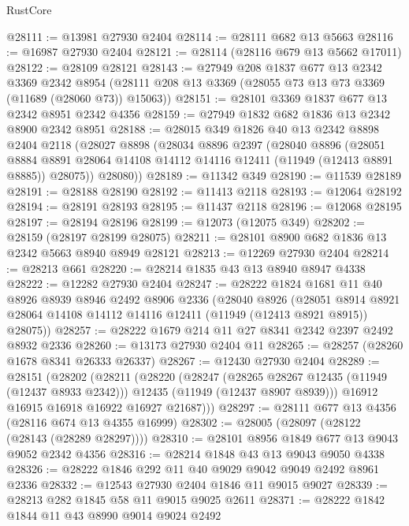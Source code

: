 \begin{lexlean}{RustCore}
\begin{coremodule}
@28111 := @13981 @27930 @2404
@28114 := @28111 @682 @13 @5663
@28116 := @16987 @27930 @2404
@28121 := @28114 (@28116 @679 @13 @5662 @17011)
@28122 := @28109 @28121
@28143 := @27949
    @208
    @1837
    @677
    @13
    @2342
    @3369
    @2342
    @8954
    (@28111 @208 @13 @3369 (@28055 @73 @13 @73 @3369 (@11689 (@28060 @73)) @15063))
@28151 := @28101 @3369 @1837 @677 @13 @2342 @8951 @2342 @4356
@28159 := @27949 @1832 @682 @1836 @13 @2342 @8900 @2342 @8951
@28188 := @28015
    @349
    @1826
    @40
    @13
    @2342
    @8898
    @2404
    @2118
    (@28027
      @8898
      (@28034
        @8896
        @2397
        (@28040
          @8896
          (@28051
            @8884
            @8891
            @28064
            @14108
            @14112
            @14116
            @12411
            (@11949 (@12413 @8891 @8885))
            @28075))
        @28080))
@28189 := @11342 @349
@28190 := @11539 @28189
@28191 := @28188 @28190
@28192 := @11413 @2118
@28193 := @12064 @28192
@28194 := @28191 @28193
@28195 := @11437 @2118
@28196 := @12068 @28195
@28197 := @28194 @28196
@28199 := @12073 (@12075 @349)
@28202 := @28159 (@28197 @28199 @28075)
@28211 := @28101 @8900 @682 @1836 @13 @2342 @5663 @8940 @8949 @28121
@28213 := @12269 @27930 @2404
@28214 := @28213 @661
@28220 := @28214 @1835 @43 @13 @8940 @8947 @4338
@28222 := @12282 @27930 @2404
@28247 := @28222
    @1824
    @1681
    @11
    @40
    @8926
    @8939
    @8946
    @2492
    @8906
    @2336
    (@28040
      @8926
      (@28051 @8914 @8921 @28064 @14108 @14112 @14116 @12411 (@11949 (@12413 @8921 @8915)) @28075))
@28257 := @28222 @1679 @214 @11 @27 @8341 @2342 @2397 @2492 @8932 @2336
@28260 := @13173 @27930 @2404 @11
@28265 := @28257 (@28260 @1678 @8341 @26333 @26337)
@28267 := @12430 @27930 @2404
@28289 := @28151
    (@28202
      (@28211
        (@28220
          (@28247
            (@28265 @28267 @12435 (@11949 (@12437 @8933 @2342)))
            @12435
            (@11949 (@12437 @8907 @8939)))
          @16912
          @16915
          @16918
          @16922
          @16927
          @21687)))
@28297 := @28111 @677 @13 @4356 (@28116 @674 @13 @4355 @16999)
@28302 := @28005 (@28097 (@28122 (@28143 (@28289 @28297))))
@28310 := @28101 @8956 @1849 @677 @13 @9043 @9052 @2342 @4356
@28316 := @28214 @1848 @43 @13 @9043 @9050 @4338
@28326 := @28222 @1846 @292 @11 @40 @9029 @9042 @9049 @2492 @8961 @2336
@28332 := @12543 @27930 @2404 @1846 @11 @9015 @9027
@28339 := @28213 @282 @1845 @58 @11 @9015 @9025 @2611
@28371 := @28222
    @1842
    @1844
    @11
    @43
    @8990
    @9014
    @9024
    @2492

\end{coremodule}
\end{lexlean}
